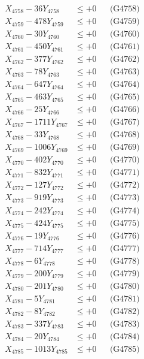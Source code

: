\documentclass[a4paper,10pt]{article}
\begin{document}
{\begin{align}
X_{4758} - 36Y_{4758} &\leq +0 && \text{(G4758)} \\
X_{4759} - 478Y_{4759} &\leq +0 && \text{(G4759)} \\
X_{4760} - 30Y_{4760} &\leq +0 && \text{(G4760)} \\
\allowbreak
X_{4761} - 450Y_{4761} &\leq +0 && \text{(G4761)} \\
X_{4762} - 377Y_{4762} &\leq +0 && \text{(G4762)} \\
X_{4763} - 78Y_{4763} &\leq +0 && \text{(G4763)} \\
X_{4764} - 647Y_{4764} &\leq +0 && \text{(G4764)} \\
X_{4765} - 463Y_{4765} &\leq +0 && \text{(G4765)} \\
X_{4766} - 25Y_{4766} &\leq +0 && \text{(G4766)} \\
X_{4767} - 1711Y_{4767} &\leq +0 && \text{(G4767)} \\
X_{4768} - 33Y_{4768} &\leq +0 && \text{(G4768)} \\
X_{4769} - 1006Y_{4769} &\leq +0 && \text{(G4769)} \\
X_{4770} - 402Y_{4770} &\leq +0 && \text{(G4770)} \\
\allowbreak
X_{4771} - 832Y_{4771} &\leq +0 && \text{(G4771)} \\
X_{4772} - 127Y_{4772} &\leq +0 && \text{(G4772)} \\
X_{4773} - 919Y_{4773} &\leq +0 && \text{(G4773)} \\
X_{4774} - 242Y_{4774} &\leq +0 && \text{(G4774)} \\
X_{4775} - 424Y_{4775} &\leq +0 && \text{(G4775)} \\
X_{4776} - 19Y_{4776} &\leq +0 && \text{(G4776)} \\
X_{4777} - 714Y_{4777} &\leq +0 && \text{(G4777)} \\
X_{4778} - 6Y_{4778} &\leq +0 && \text{(G4778)} \\
X_{4779} - 200Y_{4779} &\leq +0 && \text{(G4779)} \\
X_{4780} - 201Y_{4780} &\leq +0 && \text{(G4780)} \\
\allowbreak
X_{4781} - 5Y_{4781} &\leq +0 && \text{(G4781)} \\
X_{4782} - 8Y_{4782} &\leq +0 && \text{(G4782)} \\
X_{4783} - 337Y_{4783} &\leq +0 && \text{(G4783)} \\
X_{4784} - 20Y_{4784} &\leq +0 && \text{(G4784)} \\
X_{4785} - 1013Y_{4785} &\leq +0 && \text{(G4785)} \\

\end{align}}
\end{document}
